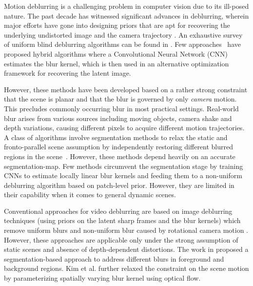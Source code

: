 \documentclass[10pt,twocolumn,letterpaper]{article}
\begin{document}
Motion deblurring is a challenging problem in computer vision due to its ill-posed nature. The past decade has witnessed significant advances in deblurring, wherein major efforts have gone into designing priors that are apt for recovering the underlying undistorted image and the camera trajectory \cite{xu2010two,pan2016robust,fergus2006removing,shan2008high,
 cho2009fast,joshi2008psf,krishnan2009fast,krishnan2011blind,xu2010two,
 pan2014deblurring,pan2016blind,vasu2017local,yan2017image, chandramouli2010inferring, paramanand2011depth, paramanand2013non, vijay2013non, rao2014inferring,nimisha2018unsupervised,mohan2019unconstrained,purohit2020region,mohan2021deep,paramanand2014shape,rao2014harnessing, nimisha2017blur,vasu2017local,nimisha2018generating,vasu2018non,purohit2018learning,purohit2019bringing}. An exhaustive survey of uniform blind deblurring algorithms can be found in \cite{lai2016comparative}. Few approaches~\cite{chakrabarti2016neural,schuler2013machine,schuler2016learning} have proposed hybrid algorithms where a Convolutional Neural Network (CNN) estimates the blur kernel, which is then used in an alternative optimization framework for recovering the latent image. 


However, these methods have been developed based on a rather strong constraint that the scene is planar and that the blur is governed by only \textit{camera} motion. This precludes commonly occurring blur in most practical settings. Real-world blur arises from various sources including moving objects, camera shake and depth variations, causing different pixels to acquire different motion trajectories. A class of algorithms involve segmentation methods to relax the static and fronto-parallel scene assumption by independently restoring different blurred regions in the scene~\cite{hyun2013dynamic}. However, these methods depend heavily on an accurate segmentation-map. Few methods \cite{sun2015learning,gong2017motion} circumvent the segmentation stage by training CNNs to estimate locally linear blur kernels and feeding them to a non-uniform deblurring algorithm based on patch-level prior. However, they are limited in their capability when it comes to general dynamic scenes.  

Conventional approaches for video deblurring are based
on image deblurring techniques (using priors on the latent sharp frames and the blur kernels) which remove uniform blurs \cite{cai2009blind,zhang2013multi} and non-uniform blur caused by rotational camera motion \cite{li2010generating,cho2012registration,zhang2014multi,zhang2015intra}.  However, these approaches are applicable only under the strong assumption of static scenes and absence of depth-dependent distortions. The work in \cite{wulff2014modeling} proposed a segmentation-based approach to address different blurs in foreground and background regions. Kim et al. \cite{hyun2015generalized} further relaxed the constraint on the scene motion by parameterizing spatially varying blur kernel using optical flow.
\end{document}
